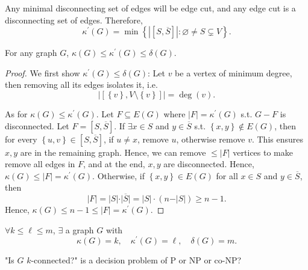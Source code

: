 \begin{observation}
    Any minimal disconnecting set of edges will be edge cut, and any edge cut is a disconnecting set of edges. Therefore,
    \[
        \kappa ^{\prime} (G) = \min \left\{ \left\vert \left[ S, \overline{S}  \right] \right\vert  : \varnothing \neq S \subsetneq V  \right\}. 
    \]
\end{observation}

\begin{theorem}[Whitney, 1932] \label{thm: kappa kappa prime delta}
    For any graph \(G\), \(\kappa (G) \le \kappa ^{\prime} (G) \le \delta (G)\).  
\end{theorem}
\begin{proof}
    We first show \(\kappa ^{\prime} (G) \le \delta (G)\): Let \(v\) be a vertex of minimum degree, then removing all its edges isolates it, i.e. 
    \[
        \left\vert \left[ \left\{ v \right\}, V \setminus \left\{ v \right\}   \right]  \right\vert = \deg (v). 
    \]  

    As for \(\kappa (G) \le \kappa ^{\prime} (G)\). Let \(F \subseteq E(G)\) where \(\vert F \vert = \kappa ^{\prime} (G) \) s.t. \(G - F\) is disconnected. Let \(F = [S, \overline{S}]\). If \(\exists x \in S\) and \(y \in \overline{S}\) s.t. \(\left\{ x, y \right\} \notin E(G) \), then for every \(\left\{ u, v \right\} \in [S, \overline{S}] \), if \(u \neq x\), remove \(u\), otherwise remove \(v\). This ensures \(x, y\) are in the remaining graph.  Hence, we can remove \(\le \vert F \vert \) vertices to make remove all edges in \(F\), and at the end, \(x, y\) are disconnected. Hence, \(\kappa (G) \le \vert F \vert = \kappa ^{\prime} (G) \). Otherwise, if \(\left\{ x, y \right\} \in E(G) \) for all \(x \in S\) and \(y \in \overline{S}\), then
    \[
        \vert F \vert = \vert S \vert \cdot \vert \overline{S} \vert = \vert S \vert \cdot (n - \vert S \vert ) \ge n - 1. 
    \]                
    Hence, \(\kappa (G) \le n - 1 \le \vert F \vert = \kappa ^{\prime} (G) \). 
\end{proof}

\begin{exercise}[HW]
    \(\forall k \le \ell \le m\), \(\exists \) a graph \(G\) with 
    \[
        \kappa (G) = k, \quad \kappa ^{\prime} (G) = \ell, \quad \delta (G) = m. 
    \]  
\end{exercise}

\begin{question}
    "Is \(G\) \(k\)-connected?" is a decision problem of P or NP or co-NP?  
\end{question}

